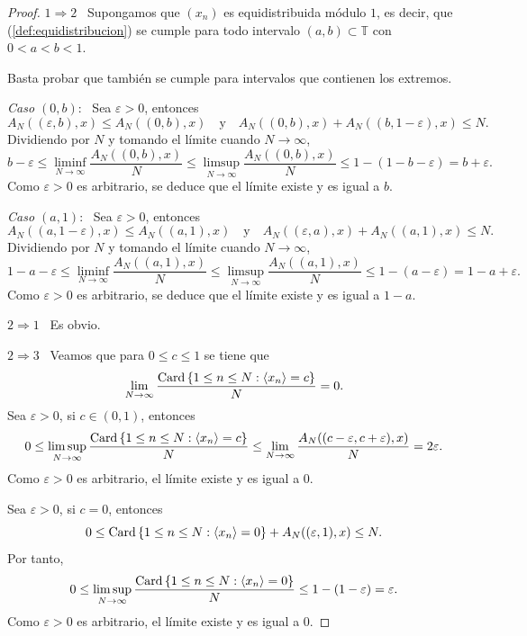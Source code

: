\begin{proof}
    $1 \Longrightarrow 2$ \, Supongamos que $(x_n)$ es equidistribuida módulo $1$,
    es decir, que (\ref{def:equidistribucion}) se cumple para todo intervalo
    $(a,b) \subset \mathbb{T}$ con $0 < a < b < 1$.

    Basta probar que también se cumple para intervalos que contienen los extremos.

    \textit{Caso $(0,b)$}: \, Sea $\varepsilon > 0$, entonces
    \[
        A_N((\varepsilon, b), x) \leq A_N((0,b), x) 
        \quad \text{y} \quad 
        A_N((0,b), x) + A_N((b, 1-\varepsilon), x) \leq N.
    \]
    Dividiendo por $N$ y tomando el límite cuando $N \to \infty$, 
    \[
        b-\varepsilon \leq 
        \liminf_{N \to \infty} \frac{A_N((0,b), x)}{N} \leq
        \limsup_{N \to \infty} \frac{A_N((0,b), x)}{N} \leq 
        1 - (1-b-\varepsilon) = 
        b + \varepsilon.
    \]
    Como $\varepsilon > 0$ es arbitrario, se deduce que el límite existe y es igual a $b$.
    
    \textit{Caso $(a,1)$}: \, Sea $\varepsilon > 0$, entonces
    \[
        A_N((a, 1-\varepsilon), x) \leq A_N((a,1), x) 
        \quad \text{y} \quad 
        A_N((\varepsilon,a), x) + A_N((a, 1), x) \leq N.
    \]
    Dividiendo por $N$ y tomando el límite cuando $N \to \infty$, 
    \[
        1-a-\varepsilon \leq 
        \liminf_{N \to \infty} \frac{A_N((a,1), x)}{N} \leq
        \limsup_{N \to \infty} \frac{A_N((a,1), x)}{N} \leq 
        1 - (a-\varepsilon) = 
        1- a + \varepsilon.
    \]
    Como $\varepsilon > 0$ es arbitrario, se deduce que el límite existe y es igual a $1-a$.

    $2 \Longrightarrow 1$ \, Es obvio.

    $2 \Longrightarrow 3$ \, Veamos que para $0\leq c \leq 1$ se tiene que
    \[
        \lim_{N \to \infty} \frac{\operatorname{Card} \left\{1\leq n \leq N :\langle x_n \rangle=c\right\}}{N} = 0.
    \]
    Sea $\varepsilon > 0$, si $c \in (0,1)$, entonces
    \[
        0 \leq 
        \limsup_{N \to \infty} \frac{\operatorname{Card} \left\{1\leq n \leq N :\langle x_n \rangle=c\right\}}{N} \leq
        \lim_{N \to \infty} \frac{A_N((c-\varepsilon, c+\varepsilon), x)}{N} = 2\varepsilon.
    \]
    Como $\varepsilon > 0$ es arbitrario, el límite existe y es igual a $0$.
    
    Sea $\varepsilon > 0$, si $c = 0$, entonces
    \[
        0 \leq 
        \operatorname{Card} \left\{1\leq n \leq N :\langle x_n \rangle=0\right\} +
        A_N((\varepsilon, 1), x) \leq
        N.
    \]
    Por tanto,
    \[
        0 \leq 
        \limsup_{N \to \infty} \frac{\operatorname{Card} \left\{1\leq n \leq N :\langle x_n \rangle=0\right\}}{N} \leq
        1 - (1-\varepsilon) = 
        \varepsilon.
    \]
    Como $\varepsilon > 0$ es arbitrario, el límite existe y es igual a $0$.


\end{proof}
